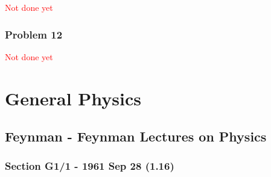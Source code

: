 \documentclass[10pt,a4paper]{article}
\theoremstyle{definition}
\begin{document}
\textcolor{red}{Not done yet}
\subsubsection{Problem 12}
\textcolor{red}{Not done yet}


\section{General Physics}

\subsection{{\sc Feynman} - Feynman Lectures on Physics}
\subsubsection{Section G1/1 - 1961 Sep 28 (1.16)}
\end{document}
